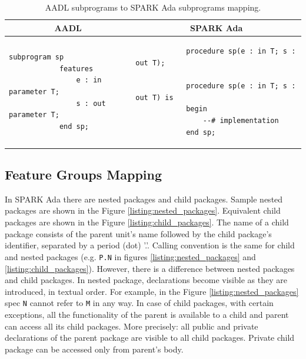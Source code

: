 \singlespacing
\begin{table}[!ht]
	\caption{AADL subprograms to SPARK Ada subprograms mapping.}
	\label{table:subprograms_mapping}
	\centering
  	\begin{tabular}{ | p{3in} | p{3in} |}

		\hline
		\multicolumn{1}{|c|}{\textbf{AADL}} & \multicolumn{1}{|c|}{\textbf{SPARK Ada}} \\ \hline

		\begin{lstlisting}[language=aadl]
			subprogram sp
			features
				e : in parameter T;
				s : out parameter T;
			end sp;
		\end{lstlisting} 
		& 
		\begin{lstlisting}
			procedure sp(e : in T; s : out T);

			procedure sp(e : in T; s : out T) is 
			begin
				--# implementation
			end sp;
		\end{lstlisting} 		

		\\ \hline
	\end{tabular}
\end{table}
\doublespacing


\subsection{Feature Groups Mapping}
\label{codegen:mapping:feature_groups}

In SPARK Ada there are nested packages and child packages. Sample nested packages are shown in the Figure \ref{listing:nested_packages}. Equivalent child packages are shown in the Figure \ref{listing:child_packages}. The name of a child package consists of the parent unit's name followed by the child package's identifier, separated by a period (dot) '.'. Calling convention is the same for child and nested packages (e.g. \lstinline{P.N} in figures \ref{listing:nested_packages} and \ref{listing:child_packages}). However, there is a difference between nested packages and child packages. In nested package, declarations become visible as they are introduced, in textual order. For example, in the Figure \ref{listing:nested_packages} spec \lstinline{N} cannot refer to \lstinline{M} in any way. In case of child packages, with certain exceptions, all the functionality of the parent is available to a child and parent can access all its child packages. More precisely: all public and private declarations of the parent package are visible to all child packages. Private child package can be accessed only from parent's body.

